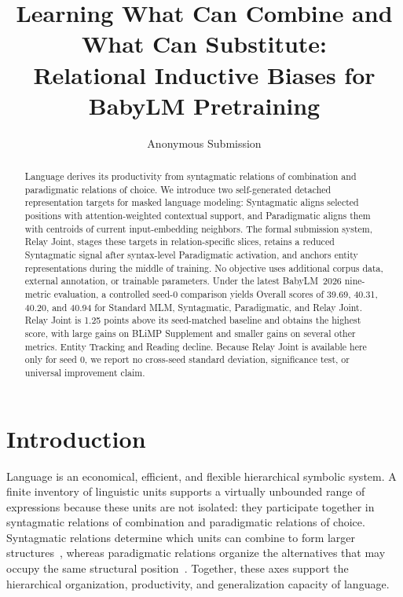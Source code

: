 \documentclass[11pt,a4paper]{article}
\title{Learning What Can Combine and What Can Substitute:\\
 Relational Inductive Biases for BabyLM Pretraining}
\author{Anonymous Submission}
\date{}
\newcommand{\relayjoint}{Relay Joint}
\begin{document}
\raggedbottom
\maketitle

\begin{abstract}
Language derives its productivity from syntagmatic relations of
combination and paradigmatic relations of choice. We introduce two
self-generated detached representation targets for masked language
modeling: Syntagmatic aligns selected positions with attention-weighted
contextual support, and Paradigmatic aligns them with centroids of
current input-embedding neighbors. The formal submission system,
\relayjoint{}, stages these targets in relation-specific slices,
retains a reduced Syntagmatic signal after syntax-level Paradigmatic
activation, and anchors entity representations during the middle of
training. No objective uses additional corpus data, external
annotation, or trainable parameters. Under the latest BabyLM~2026
nine-metric evaluation, a controlled seed-0 comparison yields Overall
scores of 39.69, 40.31, 40.20, and 40.94 for Standard MLM,
Syntagmatic, Paradigmatic, and Relay Joint. Relay Joint is 1.25 points
above its seed-matched baseline and obtains the highest score, with
large gains on BLiMP Supplement and smaller gains on several other
metrics. Entity Tracking and Reading decline. Because Relay Joint is
available here only for seed 0, we report no cross-seed standard
deviation, significance test, or universal improvement claim.
\end{abstract}

\section{Introduction}

Language is an economical, efficient, and flexible hierarchical
symbolic system. A finite inventory of linguistic units supports a
virtually unbounded range of expressions because these units are not
isolated: they participate together in syntagmatic relations of
combination and paradigmatic relations of choice. Syntagmatic relations
determine which units can combine to form larger
structures~\cite{saussure1916cours,firth1957synopsis}, whereas
paradigmatic relations organize the alternatives that may occupy the
same structural
position~\cite{saussure1916cours,halliday1961categories,harris1954distributional}.
Together, these axes support the hierarchical organization,
productivity, and generalization capacity of language.
\end{document}

